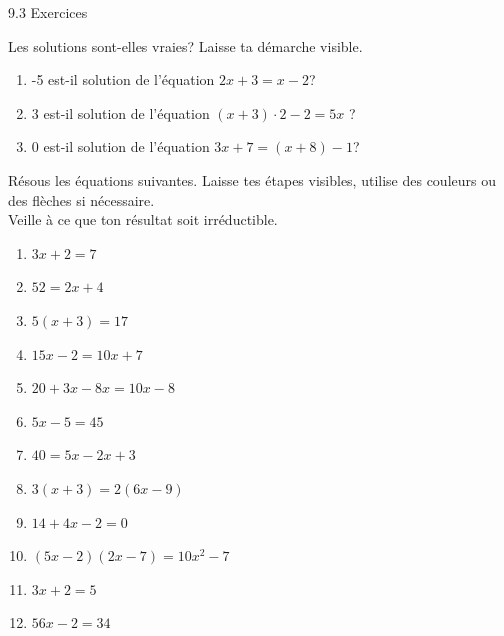 \documentclass[parskip=half-, 12pt, DIV=15, twoside=semi]{scrbook}
\begin{document}
\begin{huge}
    9.3 Exercices
\end{huge}

\medbreak

\begin{exercise}
    Les solutions sont-elles vraies? Laisse ta démarche visible.
    \begin{enumerate}[itemsep=1em]
        \item -5 est-il solution de l'équation \(2x +3 = x -2\)?
        \item 3 est-il solution de l'équation \((x+3)\cdot 2- 2 = 5x \) ?
        \item 0 est-il solution de l'équation \(3x + 7 = (x + 8) - 1\)?
    \end{enumerate}
    \vspace{2em}
\end{exercise}

\begin{exercise}
    Résous les équations suivantes. Laisse tes étapes visibles, utilise des couleurs ou des flèches si nécessaire.\\ Veille à ce que ton résultat soit irréductible. 
    \begin{enumerate}[cols=2, itemsep=1em]
        \item \(3x + 2 = 7\)
        \item \(52 = 2x + 4\)
        \item \(5(x+3)=17\)
        \item \(15x - 2 = 10x + 7\)
        \item \(20 + 3x - 8x = 10x - 8\)
        \item \(5x - 5 = 45\)
        \item \(40 = 5x - 2x + 3\)
        \item \(3(x+3)= 2(6x-9)\)
        \item \(14 + 4x - 2 = 0\)
        \item \(\left(5x - 2\right)\left(2x - 7\right) = 10x^2 - 7 \)
        \item \(3x + 2 = 5\)
        \item \(56 x - 2 = 34 \)
    \end{enumerate}
\end{exercise}
\end{document}
